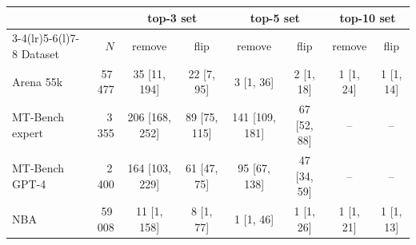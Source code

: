 {\scriptsize\setlength{\tabcolsep}{3pt}\begin{tabular}{@{}lrcccccc@{}}\toprule
 & & \multicolumn{2}{c}{top-3 set} & \multicolumn{2}{c}{top-5 set} & \multicolumn{2}{c}{top-10 set}\\
\cmidrule(lr){3-4}\cmidrule(lr){5-6}\cmidrule(l){7-8}
Dataset & $N$ & remove & flip & remove & flip & remove & flip\\\midrule
Arena 55k & 57\,477 & 35 [11, 194] & 22 [7, 95] & 3 [1, 36] & 2 [1, 18] & 1 [1, 24] & 1 [1, 14] \\
MT-Bench expert & 3\,355 & 206 [168, 252] & 89 [75, 115] & 141 [109, 181] & 67 [52, 88] & -- & -- \\
MT-Bench GPT-4 & 2\,400 & 164 [103, 229] & 61 [47, 75] & 95 [67, 138] & 47 [34, 59] & -- & -- \\
NBA & 59\,008 & 11 [1, 158] & 8 [1, 77] & 1 [1, 46] & 1 [1, 26] & 1 [1, 21] & 1 [1, 13] \\
\bottomrule\end{tabular}}
